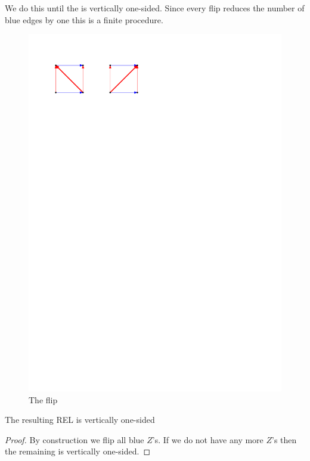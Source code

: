     We do this until the \rel is vertically one-sided. Since every flip reduces the number of blue edges by one this is a finite procedure.

    \begin{figure}[h]
      \centering
      \includegraphics[scale=1]{unifiedAlgo/img/zflip/flip.pdf}
      \caption{The flip}
      \label{fig:zflip:flip}
    \end{figure}

    \begin{lemma}
      \label{lm:sweep:vertOnsided}
      The resulting REL is vertically one-sided
    \end{lemma}
    \begin{proof}
      By construction we flip all blue $Z$'s. If we do not have any more $Z$'s then the remaining \rel is vertically one-sided. 
    \end{proof}

